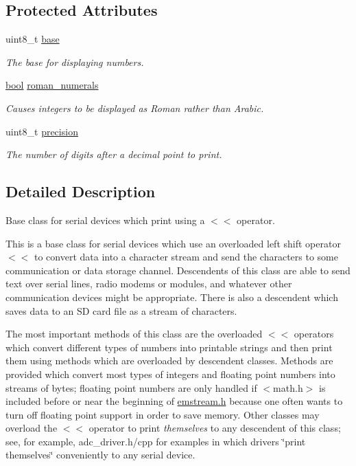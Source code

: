 \subsection*{Protected Attributes}
\begin{DoxyCompactItemize}
\item 
uint8\+\_\+t \mbox{\hyperlink{classemstream_abbf460d8c60420b025b7316f6979ad04}{base}}
\begin{DoxyCompactList}\small\item\em The base for displaying numbers. \end{DoxyCompactList}\item 
\mbox{\hyperlink{group___motor___boolean___type_ga0ecf26b576b9a54eca656b9be7ba6a06}{bool}} \mbox{\hyperlink{classemstream_aaad81a99476a18142e9cc285a00de06f}{roman\+\_\+numerals}}
\begin{DoxyCompactList}\small\item\em Causes integers to be displayed as Roman rather than Arabic. \end{DoxyCompactList}\item 
uint8\+\_\+t \mbox{\hyperlink{classemstream_af9c514aedfafcc2567d613396bc0cf7b}{precision}}
\begin{DoxyCompactList}\small\item\em The number of digits after a decimal point to print. \end{DoxyCompactList}\end{DoxyCompactItemize}


\subsection{Detailed Description}
Base class for serial devices which print using a {\ttfamily $<$$<$} operator. 

This is a base class for serial devices which use an overloaded left shift operator {\ttfamily $<$$<$} to convert data into a character stream and send the characters to some communication or data storage channel. Descendents of this class are able to send text over serial lines, radio modems or modules, and whatever other communication devices might be appropriate. There is also a descendent which saves data to an SD card file as a stream of characters.

The most important methods of this class are the overloaded {\ttfamily $<$$<$} operators which convert different types of numbers into printable strings and then print them using methods which are overloaded by descendent classes. Methods are provided which convert most types of integers and floating point numbers into streams of bytes; floating point numbers are only handled if {\ttfamily $<$math.\+h$>$} is included before or near the beginning of {\ttfamily \mbox{\hyperlink{emstream_8h}{emstream.\+h}}} because one often wants to turn off floating point support in order to save memory. Other classes may overload the {\ttfamily $<$$<$} operator to print {\itshape themselves} to any descendent of this class; see, for example, {\ttfamily adc\+\_\+driver.\+h/cpp} for examples in which drivers \char`\"{}print themselves\char`\"{} conveniently to any serial device.


